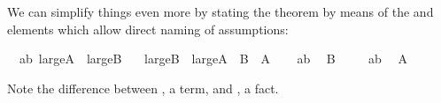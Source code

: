 \begin{isabellebody}
\begin{isamarkuptext}
We can simplify things even more by stating the theorem by means of the
 and  elements which allow direct
naming of assumptions:%
\end{isamarkuptext}%
\isamarkuptrue%
\isamarkupfalse%
\ \ ab{}\ {}large{}A\ {}\ large{}B{}\isanewline
\ \ \ {}large{}B\ {}\ large{}A{}\ {}\ {}{}B\ {}\ {}A{}{}\isanewline
%
\isadelimproof
%
\endisadelimproof
%
\isatagproof
{}\isamarkupfalse%
\isanewline
\ \ \isamarkupfalse%
\ ab\ \isamarkupfalse%
\ {}{}B{}\ \isamarkupfalse%
\isanewline
{}\isamarkupfalse%
\isanewline
\ \ \isamarkupfalse%
\ ab\ \isamarkupfalse%
\ {}{}A{}\ \isamarkupfalse%
\isanewline
{}\isamarkupfalse%
%
\endisatagproof
{\isafoldproof}%
%
\isadelimproof
%
\endisadelimproof
%
\begin{isamarkuptext}%
\noindent Note the difference between , a term, and
, a fact.


\end{isamarkuptext}
\end{isabellebody}
